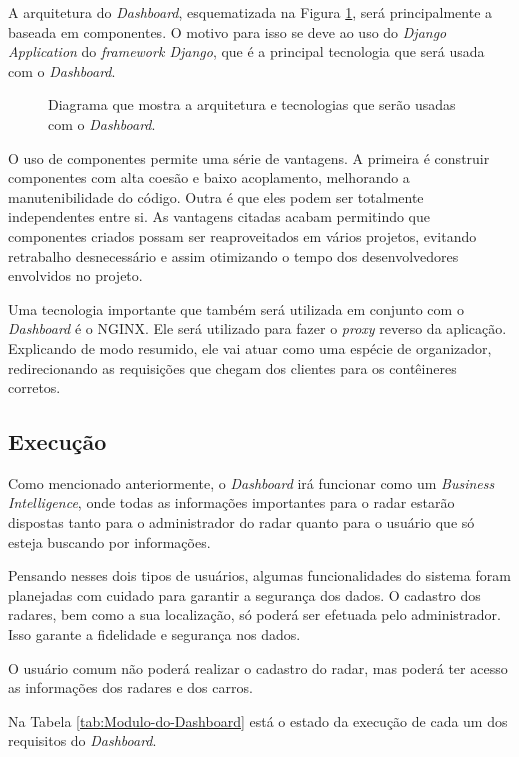 A arquitetura do \textit{Dashboard}, esquematizada na Figura \ref{fig:diagrama-arq-dashboard}, será principalmente a baseada em componentes. O motivo para isso se deve ao uso do \textit{Django Application} do \textit{framework Django}, que é a principal tecnologia que será usada com o \textit{Dashboard}.

\begin{figure}[H]
	\caption{\label{fig:diagrama-arq-dashboard} Diagrama que mostra a arquitetura e tecnologias que serão usadas com o \textit{Dashboard}.}
\end{figure}

O uso de componentes permite uma série de vantagens. A primeira é construir componentes com alta coesão e baixo acoplamento, melhorando a manutenibilidade do código. Outra é que eles podem ser totalmente independentes entre si. As vantagens citadas acabam permitindo que componentes criados possam ser reaproveitados em vários projetos, evitando retrabalho desnecessário e assim otimizando o tempo dos desenvolvedores envolvidos no projeto.

Uma tecnologia importante que também será utilizada em conjunto com o \textit{Dashboard} é o NGINX. Ele será utilizado para fazer o \textit{proxy} reverso da aplicação. Explicando de modo resumido, ele vai atuar como uma espécie de organizador, redirecionando as requisições que chegam dos clientes para os contêineres corretos.

\subsection{Execução}

Como mencionado anteriormente, o \textit{Dashboard} irá funcionar como um \textit{Business Intelligence}, onde todas as informações importantes para o radar estarão dispostas tanto para o administrador do radar quanto para o usuário que só esteja buscando por informações.

Pensando nesses dois tipos de usuários, algumas funcionalidades do sistema foram planejadas com cuidado para garantir a segurança dos dados. O cadastro dos radares, bem como a sua localização, só poderá ser efetuada pelo administrador. Isso garante a fidelidade e segurança nos dados.

O usuário comum não poderá realizar o cadastro do radar, mas poderá ter acesso as informações dos radares e dos carros.

Na Tabela \ref{tab:Modulo-do-Dashboard} está o estado da execução de cada um dos requisitos do \textit{Dashboard}.


